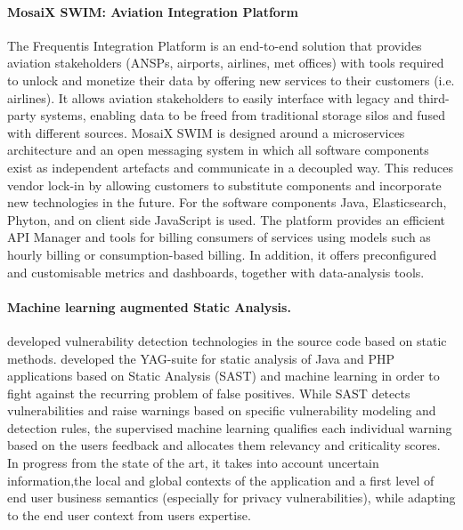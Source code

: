 \documentclass[a4paper,11pt]{article}
\begin{document}
\paragraph{\FRQshort{} MosaiX SWIM: Aviation Integration Platform}
\label{sec:swim}
The Frequentis Integration Platform is an end-to-end solution that provides aviation stakeholders (ANSPs, airports, airlines, met offices) with tools required to unlock and monetize their data by offering new services to their customers (i.e. airlines). It allows aviation stakeholders to easily interface with legacy and third-party systems, enabling data to be freed from traditional storage silos and fused with different sources. MosaiX SWIM is designed around a microservices architecture and an open messaging system in which all software components exist as independent artefacts and communicate in a decoupled way. This reduces vendor lock-in by allowing customers to substitute components and incorporate new technologies in the future. For the software components  Java, Elasticsearch, Phyton, and on client side JavaScript is used. The platform provides an efficient API Manager and tools for billing consumers of services using models such as hourly billing or consumption-based billing. In addition, it offers preconfigured and customisable metrics and dashboards, together with data-analysis tools.



\paragraph{\YAGshort{} Machine learning augmented Static Analysis.}

\YAGshort{} developed vulnerability detection technologies in the source code based on static methods. \YAGshort{} developed the YAG-suite for static analysis of Java and PHP applications based on Static Analysis (SAST) and machine learning in order to fight against the recurring problem of false positives. While SAST detects vulnerabilities and raise warnings based on specific vulnerability modeling and detection rules, the supervised machine learning qualifies each individual warning based on the users feedback and allocates them
relevancy and criticality scores. In progress from the state of the art, it takes into account uncertain information,the local and global contexts of the application and a first level of end user business semantics (especially for privacy vulnerabilities), while adapting to the end user context from users expertise. 
\end{document}
